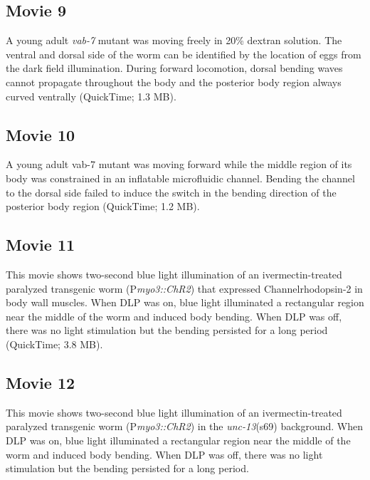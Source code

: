 \subsection{Movie 9}\label{movie:prop9}
 
A young adult \textit{vab-7} mutant was moving freely in 20\% dextran solution. The ventral and dorsal 
side of the worm can be identified by the location of eggs from the dark field illumination. 
During forward locomotion, dorsal bending waves cannot propagate throughout the body and the 
posterior body region always curved ventrally (QuickTime; 1.3 MB). 
 
\subsection{Movie 10} \label{movie:prop10}
 
A young adult vab-7 mutant was moving forward while the middle region of its body was 
constrained in an inflatable microfluidic channel. Bending the channel to the dorsal side failed to 
induce the switch in the bending direction of the posterior body region (QuickTime; 1.2 MB). 
 
\subsection{Movie 11}\label{movie:prop11}
 
This movie shows two-second blue light illumination of an ivermectin-treated paralyzed 
transgenic worm (P\textit{myo3::ChR2}) that expressed Channelrhodopsin-2 in body wall muscles. 
When DLP was on, blue light illuminated a rectangular region near the middle of the worm and 
induced body bending. When DLP was off, there was no light stimulation but the bending 
persisted for a long period (QuickTime; 3.8 MB). 
 
 

\subsection{Movie 12}\label{movie:prop12}
 
This movie shows two-second blue light illumination of an ivermectin-treated paralyzed 
transgenic worm (P\textit{myo3::ChR2}) in the \textit{unc-13}(s69) background. When DLP was on, blue light 
illuminated a rectangular region near the middle of the worm and induced body bending. When 
DLP was off, there was no light stimulation but the bending persisted for a long period. 


